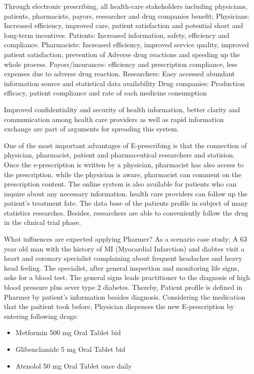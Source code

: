 \documentclass[10pt, conference, compsocconf]{IEEEtran}
\begin{document}
Through electronic prescribing, all health-care stakeholders including physicians, patients, pharmacists, payors, researcher and drug companies benefit;
Physicians: Increased efficiency, improved care, patient satisfaction and potential short and long-term incentives.
Patients: Increased information, safety, efficiency and compliance.
Pharmacists: Increased efficiency, improved service quality, improved patient satisfaction,  prevention of Adverse drug reactions and speeding up the whole process.
Payors/insurances: efficiency and prescription compliance, less expenses due to adverse drug reaction.
Researchers: Easy accessed abundant information source and statistical data availability
Drug companies: Production efficacy, patient compliance and rate of each medicine consumption

Improved confidentiality and security of health information, better clarity and communication among health care providers as well as rapid information exchange are part of arguments for spreading this system.

One of the most important advantages of E-prescribing is that the connection of physician, pharmacist, patient and pharmaceutical researchers and statision.
Once the e-prescription is written by a physician, pharmacist has also access to the prescription.
while the physician is aware, pharmacist can comment on the prescription content.
The online system is also available for patients who can inquire about any necessary information.
health care providers can follow up the patient's treatment fate.
The data base of the patients profile in subject of many statistics researches.
Besides, researchers are able to conveniently follow the drug in the clinical trial phase.

What influences are expected applying Pharmer?
As a scenario case study; A 63 year old man with the history of MI (Myocardial Infarction) and diabtes visit a heart and coronary specialist complaining about frequent headaches and heavy head feeling. The specialist, after general inspection and monitoring life signs, asks for a blood test. The general signs leads practitioner to the diagnosis of high blood pressure plus sever type 2 diabetes. Thereby, Patient profile is defined in Pharmer by patient's information besides diagnosis. Considering the medication that the paitient took before, Physician dispenses the new E-prescription by entering following drugs:

\begin{itemize}
\item {Metformin} 500 mg Oral Tablet bid
\item {Glibenclamide} 5 mg Oral Tablet bid
\item {Atenolol} 50 mg Oral Tablet once daily
\end{itemize}
\end{document}
